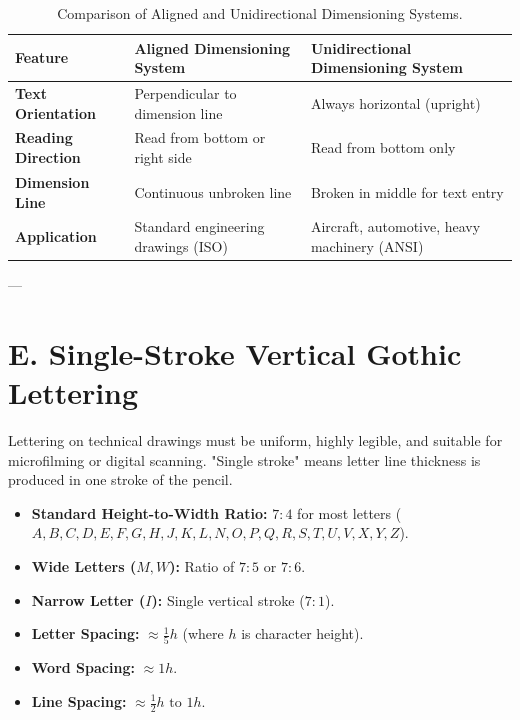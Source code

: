 \begin{table}[htbp]
\centering
\small
\begin{tabularx}{\textwidth}{l X X}
\toprule
\textbf{Feature} & \textbf{Aligned Dimensioning System} & \textbf{Unidirectional Dimensioning System} \\
\midrule
\textbf{Text Orientation} & Perpendicular to dimension line & Always horizontal (upright) \\
\textbf{Reading Direction} & Read from bottom or right side & Read from bottom only \\
\textbf{Dimension Line} & Continuous unbroken line & Broken in middle for text entry \\
\textbf{Application} & Standard engineering drawings (ISO) & Aircraft, automotive, heavy machinery (ANSI) \\
\bottomrule
\end{tabularx}
\caption{Comparison of Aligned and Unidirectional Dimensioning Systems.}
\label{tab:dimension-systems}
\end{table}

---

\section{E. Single-Stroke Vertical Gothic Lettering}

Lettering on technical drawings must be uniform, highly legible, and suitable for microfilming or digital scanning. "Single stroke" means letter line thickness is produced in one stroke of the pencil.

\begin{keyequation}
\begin{itemize}
    \item \textbf{Standard Height-to-Width Ratio:} $7:4$ for most letters ($A, B, C, D, E, F, G, H, J, K, L, N, O, P, Q, R, S, T, U, V, X, Y, Z$).
    \item \textbf{Wide Letters ($M, W$):} Ratio of $7:5$ or $7:6$.
    \item \textbf{Narrow Letter ($I$):} Single vertical stroke ($7:1$).
    \item \textbf{Letter Spacing:} $\approx \frac{1}{5} h$ (where $h$ is character height).
    \item \textbf{Word Spacing:} $\approx 1 h$.
    \item \textbf{Line Spacing:} $\approx \frac{1}{2} h \text{ to } 1 h$.
\end{itemize}
\end{keyequation}

